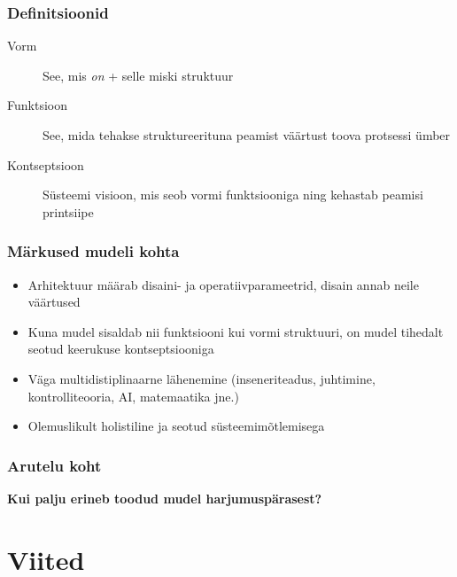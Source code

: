 \begin{frame}[fragile]
  \frametitle{Definitsioonid}
	\begin{description}
		\item[Vorm] See, mis \emph{on} + selle miski struktuur
		\item[Funktsioon] See, mida tehakse struktureerituna peamist väärtust toova protsessi ümber
		\item[Kontseptsioon] Süsteemi visioon, mis seob vormi funktsiooniga ning kehastab peamisi printsiipe
	\end{description}
\end{frame}

\begin{frame}[fragile]
  \frametitle{Märkused mudeli kohta}
	\begin{itemize}
		\item Arhitektuur määrab disaini- ja operatiivparameetrid, disain annab neile väärtused
		\item Kuna mudel sisaldab nii funktsiooni kui vormi struktuuri, on mudel tihedalt seotud keerukuse kontseptsiooniga
		\item Väga multidistiplinaarne lähenemine (inseneriteadus, juhtimine, kontrolliteooria, AI, matemaatika jne.)
		\item Olemuslikult holistiline ja seotud süsteemimõtlemisega 
	\end{itemize}
\end{frame}

\begin{frame}[fragile]
  \frametitle{Arutelu koht}
		\begin{center}
			\textbf{Kui palju erineb toodud mudel harjumuspärasest?}
		\end{center}
\end{frame}

\section{Viited}

\begin{frame}[t,allowframebreaks,]
  	
	 

\end{frame}

